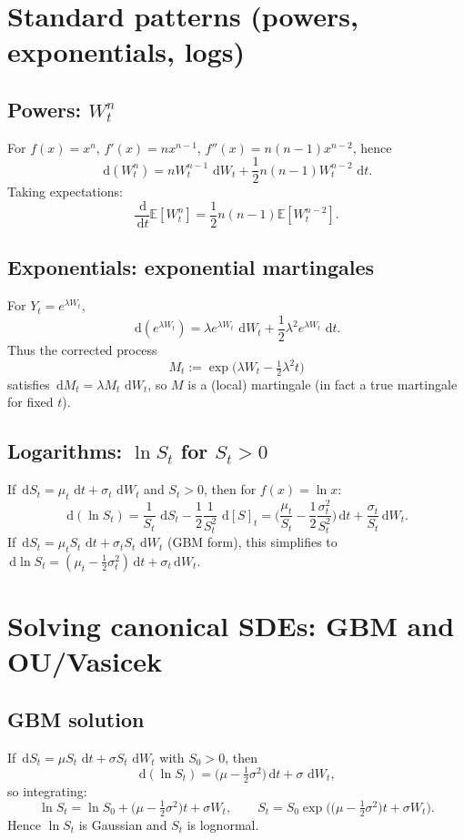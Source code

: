 \documentclass[11pt]{article}
\newcommand{\E}{\mathbb{E}}
\newcommand{\1}{\mathbf{1}}
\newcommand{\dd}{\,\mathrm{d}}
\numberwithin{equation}{section}
\theoremstyle{plain}
\theoremstyle{definition}
\theoremstyle{remark}
\begin{document}
\section{Standard patterns (powers, exponentials, logs)}

\subsection{Powers: $W_t^n$}
For $f(x)=x^n$, $f'(x)=n x^{n-1}$, $f''(x)=n(n-1)x^{n-2}$, hence
\[
\dd(W_t^n)=nW_t^{n-1}\,\dd W_t + \frac12 n(n-1)W_t^{n-2}\,\dd t.
\]
Taking expectations:
\[
\frac{\dd}{\dd t}\E[W_t^n]=\frac12 n(n-1)\E[W_t^{n-2}].
\]

\subsection{Exponentials: exponential martingales}
For $Y_t=e^{\lambda W_t}$,
\[
\dd(e^{\lambda W_t})=\lambda e^{\lambda W_t}\,\dd W_t + \frac12\lambda^2 e^{\lambda W_t}\,\dd t.
\]
Thus the corrected process
\[
M_t:=\exp\!\Big(\lambda W_t-\tfrac12\lambda^2 t\Big)
\]
satisfies $\dd M_t=\lambda M_t\,\dd W_t$, so $M$ is a (local) martingale (in fact a true martingale for fixed $t$).

\subsection{Logarithms: $\ln S_t$ for $S_t>0$}
If $\dd S_t=\mu_t\,\dd t+\sigma_t\,\dd W_t$ and $S_t>0$, then for $f(x)=\ln x$:
\[
\dd(\ln S_t)=\frac{1}{S_t}\,\dd S_t-\frac12\frac{1}{S_t^2}\,\dd[S]_t
=
\Big(\frac{\mu_t}{S_t}-\frac12\frac{\sigma_t^2}{S_t^2}\Big)\dd t+\frac{\sigma_t}{S_t}\dd W_t.
\]
If $\dd S_t=\mu_t S_t\,\dd t+\sigma_t S_t\,\dd W_t$ (GBM form), this simplifies to
$\dd\ln S_t=(\mu_t-\tfrac12\sigma_t^2)\dd t+\sigma_t\dd W_t$.

\section{Solving canonical SDEs: GBM and OU/Vasicek}

\subsection{GBM solution}
If $\dd S_t=\mu S_t\,\dd t+\sigma S_t\,\dd W_t$ with $S_0>0$, then
\[
\dd(\ln S_t)=\Big(\mu-\tfrac12\sigma^2\Big)\dd t+\sigma\,\dd W_t,
\]
so integrating:
\[
\ln S_t=\ln S_0+\Big(\mu-\tfrac12\sigma^2\Big)t+\sigma W_t,
\qquad
S_t=S_0\exp\!\Big(\big(\mu-\tfrac12\sigma^2\big)t+\sigma W_t\Big).
\]
Hence $\ln S_t$ is Gaussian and $S_t$ is lognormal.
\end{document}
